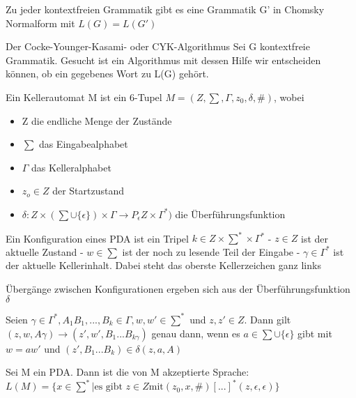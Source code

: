 \documentclass[avery5371]{flashcards}
\begin{document}
\begin{flashcard}[Satz]{ Zu jeder kontextfreien Grammatik gibt es eine Grammatik G' in Chomsky Normalform mit} $L(G)=L(G')$
\end{flashcard}

\begin{flashcard}{Der Cocke-Younger-Kasami- oder CYK-Algorithmus}
Sei G kontextfreie Grammatik.  Gesucht ist ein Algorithmus mit dessen Hilfe wir entscheiden können, ob ein gegebenes Wort zu L(G) gehört.
\end{flashcard}

\begin{flashcard}[Definition]{ Ein Kellerautomat} M ist ein 6-Tupel $M=(Z,\sum,\Gamma, z_0, \delta, \#)$, wobei\begin{itemize}
\item Z die endliche Menge der Zustände
\item $\sum$ das Eingabealphabet
\item $\Gamma$ das Kelleralphabet
\item $z_o\in Z$ der Startzustand
\item $\delta: Z \times (\sum \cup \{\epsilon\})\times \Gamma \rightarrow P_{\epsilon}Z\times\Gamma^*)$ die Überführungsfunktion
\end{itemize}
\end{flashcard}

\begin{flashcard}[Definition]{ Ein Konfiguration eines PDA} ist ein Tripel $k\in Z \times \sum^* \times \Gamma^*$
- $z\in Z$ ist der aktuelle Zustand
- $w\in\sum$ ist der noch zu lesende Teil der Eingabe
- $\gamma \in \Gamma^*$ ist der aktuelle Kellerinhalt. Dabei steht das oberste Kellerzeichen ganz links
 
Übergänge zwischen Konfigurationen ergeben sich aus der Überführungsfunktion $\delta$
\end{flashcard}

\begin{flashcard}[Definition]{ Seien $\gamma\in\Gamma^*, A_1B_1,...,B_k\in\Gamma, w, w'\in\sum^*$ und $z,z'\in Z$. Dann gilt $(z,w,A\gamma)\rightarrow (z',w', B_1...B_{k\gamma})$ genau dann, wenn} es $a\in\sum \cup\{\epsilon\}$ gibt mit $w=aw'$ und $(z',B_1...B_k)\in\delta(z,a,A)$
\end{flashcard}

\begin{flashcard}[Definition]{ Sei M ein PDA. Dann ist die von M akzeptierte Sprache:} $L(M)=\{x\in\sum^* | \text{es gibt } z\in Z \text{mit} (z_0, x, \#) [...] ^*(z,\epsilon, \epsilon)\}$
\end{flashcard}
\end{document}
